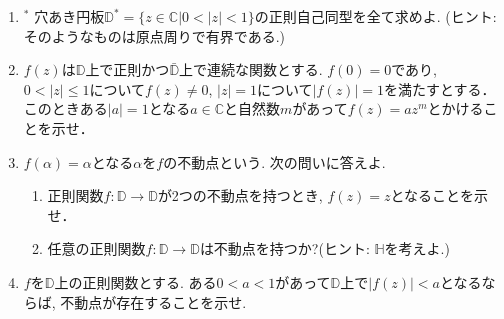 \documentclass[dvipdfmx,a4paper,11pt]{article}
\newcommand{\C}{\mathbb{C}}
\newcommand{\D}{\mathbb{D}}
\theoremstyle{definition}
\begin{document}
\begin{enumerate}[label=\textbf{問}7.\arabic*]


\item  $^{*}$ 穴あき円板$\D^{*}=\{z \in \C | 0< |z| <1 \}$の正則自己同型を全て求めよ.  (ヒント: そのようなものは原点周りで有界である.)

  

  \item $f(z)$は$\D$上で正則かつ$\bar{\D}$上で連続な関数とする. $f(0)=0$であり, $0 < |z| \le 1$について$f(z) \neq 0$, $|z|=1$について$|f(z)|=1$を満たすとする． このときある$|a|=1$となる$a \in \C$と自然数$m$があって$f(z)=az^m$とかけることを示せ．
  
  \item $f(\alpha)=\alpha$となる$\alpha$を$f$の不動点という. 次の問いに答えよ.
   \begin{enumerate}
\setlength{\parskip}{0cm} 
  \setlength{\itemsep}{0cm} 
 \item 正則関数$f : \D \to \D$が2つの不動点を持つとき, $f(z)=z$となることを示せ．
 \item 任意の正則関数$f : \D \to \D$は不動点を持つか?(ヒント: $\mathbb{H}$を考えよ.)
      \end{enumerate} 
      
      \item $f$を$\D$上の正則関数とする. ある$0 < a<1$があって$\D$上で$|f(z)| <a$となるならば, 不動点が存在することを示せ.

\newpage


\end{enumerate}
\end{document}
